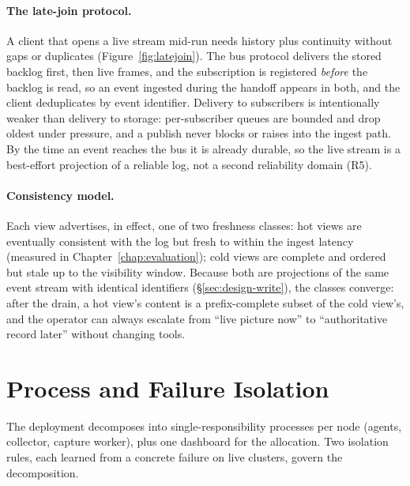 \paragraph{The late-join protocol.} A client that opens a live stream
mid-run needs history plus continuity without gaps or duplicates
(Figure~\ref{fig:latejoin}). The bus
protocol delivers the stored backlog first, then live frames, and the
subscription is registered \emph{before} the backlog is read, so an
event ingested during the handoff appears in both, and the client
deduplicates by event identifier. Delivery to subscribers is intentionally
weaker than delivery to storage: per-subscriber queues are bounded and drop
oldest under pressure, and a publish never blocks or raises into the ingest
path. By the time an event reaches the bus it is already durable, so the
live stream is a best-effort projection of a reliable log, not a second
reliability domain (R5).

\paragraph{Consistency model.} Each view advertises, in effect, one of two
freshness classes: hot views are eventually consistent with the log but
fresh to within the ingest latency (measured in
Chapter~\ref{chap:evaluation}); cold views are complete and ordered but
stale up to the visibility window. Because both are projections of the same
event stream with identical identifiers
(\S\ref{sec:design-write}), the classes converge: after the drain, a hot
view's content is a prefix-complete subset of the cold view's, and the
operator can always escalate from ``live picture now'' to ``authoritative
record later'' without changing tools.

\section{Process and Failure Isolation}
\label{sec:design-isolation}

The deployment decomposes into single-responsibility processes per node
(agents, collector, capture worker), plus one dashboard for the
allocation. Two isolation rules, each learned from a concrete failure on
live clusters, govern the decomposition.

